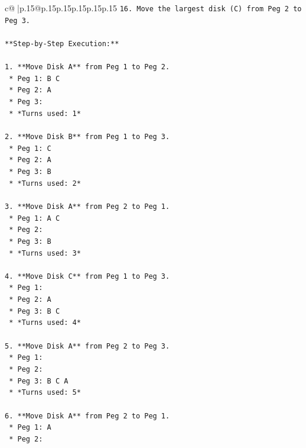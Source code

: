 \documentclass{article}
\begin{document}
{\begin{supertabular}{c@{$\;$}|p{.15\linewidth}@{}p{.15\linewidth}p{.15\linewidth}p{.15\linewidth}p{.15\linewidth}p{.15\linewidth}}
{{{\texttt{16. Move the largest disk (C) from Peg 2 to Peg 3.} \\
\\ 
\texttt{**Step{-}by{-}Step Execution:**} \\
\\ 
\texttt{1.  **Move Disk A** from Peg 1 to Peg 2.} \\
\texttt{    *   Peg 1: B C} \\
\texttt{    *   Peg 2: A} \\
\texttt{    *   Peg 3:} \\
\texttt{    *   *Turns used: 1*} \\
\\ 
\texttt{2.  **Move Disk B** from Peg 1 to Peg 3.} \\
\texttt{    *   Peg 1: C} \\
\texttt{    *   Peg 2: A} \\
\texttt{    *   Peg 3: B} \\
\texttt{    *   *Turns used: 2*} \\
\\ 
\texttt{3.  **Move Disk A** from Peg 2 to Peg 1.} \\
\texttt{    *   Peg 1: A C} \\
\texttt{    *   Peg 2:} \\
\texttt{    *   Peg 3: B} \\
\texttt{    *   *Turns used: 3*} \\
\\ 
\texttt{4.  **Move Disk C** from Peg 1 to Peg 3.} \\
\texttt{    *   Peg 1:} \\
\texttt{    *   Peg 2: A} \\
\texttt{    *   Peg 3: B C} \\
\texttt{    *   *Turns used: 4*} \\
\\ 
\texttt{5.  **Move Disk A** from Peg 2 to Peg 3.} \\
\texttt{    *   Peg 1:} \\
\texttt{    *   Peg 2:} \\
\texttt{    *   Peg 3: B C A} \\
\texttt{    *   *Turns used: 5*} \\
\\ 
\texttt{6.  **Move Disk A** from Peg 2 to Peg 1.} \\
\texttt{    *   Peg 1: A} \\
\texttt{    *   Peg 2:} \\
}}}
\end{supertabular}}
\end{document}
